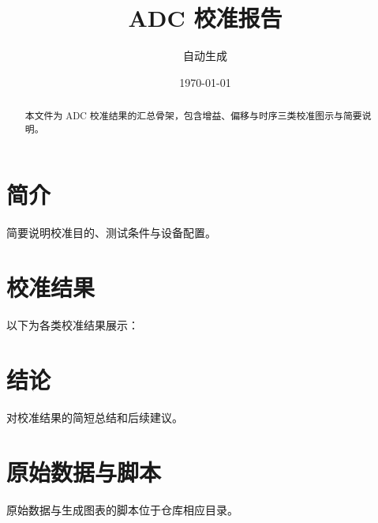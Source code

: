 \documentclass[11pt]{ctexart}
\title{ADC 校准报告}
\author{自动生成}
\date{\today}
\begin{document}
\maketitle
\begin{abstract}
本文件为 ADC 校准结果的汇总骨架，包含增益、偏移与时序三类校准图示与简要说明。
\end{abstract}

\tableofcontents
\clearpage

\section{简介}
简要说明校准目的、测试条件与设备配置。

\section{校准结果}
以下为各类校准结果展示：



\section{结论}
对校准结果的简短总结和后续建议。

\clearpage 
\appendix
\section{原始数据与脚本}
原始数据与生成图表的脚本位于仓库相应目录。
\end{document}
